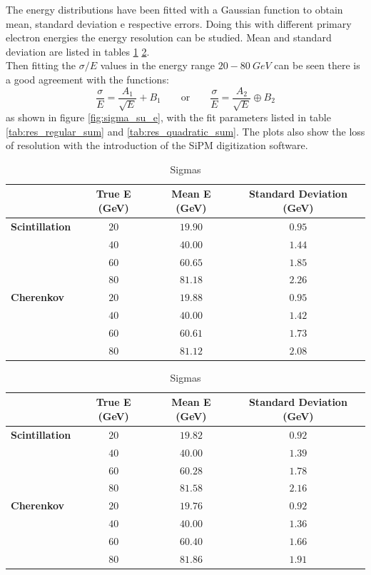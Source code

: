 The energy distributions have been fitted with a Gaussian function to obtain mean, standard deviation e respective errors. Doing this with different primary electron energies the energy resolution can be studied. Mean and standard deviation are listed in tables \ref{tab:e_res_int} \ref{tab:e_res_pe}.\\
Then fitting the $\sigma/E$ values in the energy range $20-80\ GeV$ can be seen there is a good agreement with the functions:
\begin{equation}
	\frac{\sigma}{E} = \frac{A_1}{\sqrt{E}} + B_1 \qquad \text{or} \qquad \frac{\sigma}{E} = \frac{A_2}{\sqrt{E}} \oplus B_2
\end{equation} 
as shown in figure \ref{fig:sigma_su_e}, with the fit parameters listed in table \ref{tab:res_regular_sum} and \ref{tab:res_quadratic_sum}. The plots also show the loss of resolution with the introduction of the SiPM digitization software.\\

\begin{table}
	\centering
	\begin{tabular}{lccc}
		\toprule
		& True E (GeV) & Mean E (GeV) & Standard Deviation (GeV) \\
		\midrule
		\textbf{Scintillation} &	$20$ 	& $19.90$ & $0.95$ \\
		& $40$ 	& $40.00$ & $1.44$ \\
		& $60$ 	& $60.65$ & $1.85$ \\
		& $80$ 	& $81.18$ & $2.26$ \\
		\midrule
		\textbf{Cherenkov} & $20$ 	& $19.88$ & $0.95$ \\
		& $40$ 	& $40.00$ & $1.42$ \\
		& $60$ 	& $60.61$ & $1.73$ \\
		& $80$ 	& $81.12$ & $2.08$ \\
		\bottomrule
	\end{tabular}
	\caption{Sigmas}
	\label{tab:e_res_int}
\end{table}

\begin{table}
	\centering
	\begin{tabular}{lccc}
		\toprule
		& True E (GeV) & Mean E (GeV) & Standard Deviation (GeV) \\
		\midrule
		\textbf{Scintillation} &	$20$ 	& $19.82$ & $0.92$ \\
		& $40$ 	& $40.00$ & $1.39$ \\
		& $60$ 	& $60.28$ & $1.78$ \\
		& $80$ 	& $81.58$ & $2.16$ \\
		\midrule
		\textbf{Cherenkov} & $20$ 	& $19.76$ & $0.92$ \\
		& $40$ 	& $40.00$ & $1.36$ \\
		& $60$ 	& $60.40$ & $1.66$ \\
		& $80$ 	& $81.86$ & $1.91$ \\
		\bottomrule
	\end{tabular}
	\caption{Sigmas}
	\label{tab:e_res_pe}
\end{table}


